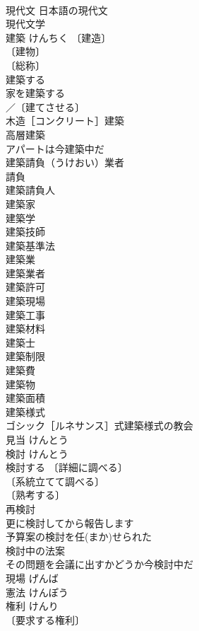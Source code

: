 \documentclass[8pt]{extreport}
\begin{document}
\begin{CJK}{UTF8}{min}
\\	現代文 日本語の現代文 
\\	現代文学 
\\	建築	けんちく	〔建造〕
\\	〔建物〕
\\	〔総称〕
\\	建築する 
\\	家を建築する 
\\	／〔建てさせる〕
\\	木造［コンクリート］建築 
\\	高層建築 
\\	アパートは今建築中だ 
\\	建築請負（うけおい）業者 
\\	請負　
\\	建築請負人 
\\	建築家 
\\	建築学 
\\	建築技師 
\\	建築基準法 
\\	建築業 
\\	建築業者 
\\	建築許可 
\\	建築現場 
\\	建築工事 
\\	建築材料 
\\	建築士 
\\	建築制限 
\\	建築費 
\\	建築物 
\\	建築面積 
\\	建築様式 
\\	ゴシック［ルネサンス］式建築様式の教会 
\\	見当	けんとう	
\\	検討	けんとう	
\\	検討する 〔詳細に調べる〕
\\	〔系統立てて調べる〕
\\	〔熟考する〕
\\	再検討 
\\	更に検討してから報告します 
\\	予算案の検討を任(まか)せられた 
\\	検討中の法案 
\\	その問題を会議に出すかどうか今検討中だ 
\\	現場	げんば	
\\	憲法	けんぽう	
\\	権利	けんり	
\\	〔要求する権利〕

\end{CJK}
\end{document}
